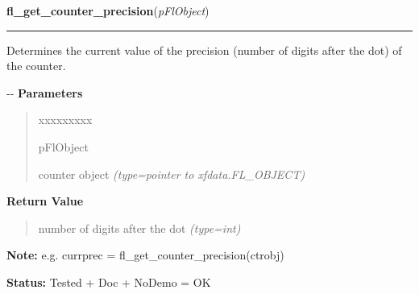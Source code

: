 \hspace{.8\funcindent}\begin{boxedminipage}{\funcwidth}

    \raggedright \textbf{fl\_get\_counter\_precision}(\textit{pFlObject})

    \vspace{-1.5ex}

    \rule{\textwidth}{0.5\fboxrule}
\setlength{\parskip}{2ex}

Determines the current value of the precision (number of digits
after the dot) of the counter.

-{}-
\setlength{\parskip}{1ex}
      \textbf{Parameters}
      \vspace{-1ex}

      \begin{quote}
        \begin{Ventry}{xxxxxxxxx}

          \item[pFlObject]


counter object
            {\it (type=pointer to xfdata.FL\_OBJECT)}

        \end{Ventry}

      \end{quote}

      \textbf{Return Value}
    \vspace{-1ex}

      \begin{quote}

number of digits after the dot
      {\it (type=int)}

      \end{quote}

\textbf{Note:} 
e.g. currprec = fl\_get\_counter\_precision(ctrobj)


\textbf{Status:} 
Tested + Doc + NoDemo = OK


    \end{boxedminipage}

    \label{xformslib:flcounter:fl_get_counter_value}

    \vspace{0.5ex}

